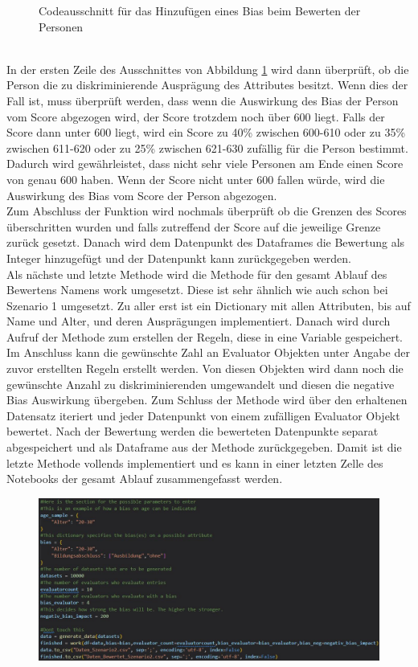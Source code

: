 \begin{onehalfspace}
\begin{figure}[h]
    \caption{Codeausschnitt für das Hinzufügen eines Bias beim Bewerten der Personen}
    \label{fig:Sz2Rate2}
\end{figure}\\
In der ersten Zeile des Ausschnittes von Abbildung \ref{fig:Sz2Rate2} wird dann überprüft, ob die Person die zu diskriminierende Ausprägung des Attributes besitzt. Wenn dies der Fall ist, muss überprüft werden, dass wenn die Auswirkung des Bias der Person vom Score abgezogen wird, der Score trotzdem noch über 600 liegt. Falls der Score dann unter 600 liegt, wird ein Score zu 40\% zwischen 600-610 oder zu 35\% zwischen 611-620 oder zu 25\% zwischen 621-630 zufällig für die Person bestimmt. Dadurch wird gewährleistet, dass nicht sehr viele Personen am Ende einen Score von genau 600 haben. Wenn der Score nicht unter 600 fallen würde, wird die Auswirkung des Bias vom Score der Person abgezogen.\\
Zum Abschluss der Funktion wird nochmals überprüft ob die Grenzen des Scores überschritten wurden und falls zutreffend der Score auf die jeweilige Grenze zurück gesetzt. Danach wird dem Datenpunkt des Dataframes die Bewertung als Integer hinzugefügt und der Datenpunkt kann zurückgegeben werden.\\
Als nächste und letzte Methode wird die Methode für den gesamt Ablauf des Bewertens Namens \glqq{}work\grqq{} umgesetzt. Diese ist sehr ähnlich wie auch schon bei Szenario 1 umgesetzt. Zu aller erst ist ein Dictionary mit allen Attributen, bis auf Name und Alter, und deren Ausprägungen implementiert. Danach wird durch Aufruf der Methode zum erstellen der Regeln, diese in eine Variable gespeichert. Im Anschluss kann die gewünschte Zahl an  \glqq{}Evaluator\grqq{} Objekten unter Angabe der zuvor erstellten Regeln erstellt werden. Von diesen Objekten wird dann noch die gewünschte Anzahl zu diskriminierenden umgewandelt und diesen die negative Bias Auswirkung übergeben. Zum Schluss der Methode wird über den erhaltenen Datensatz iteriert und jeder Datenpunkt von einem zufälligen \glqq{}Evaluator\grqq{} Objekt bewertet. Nach der Bewertung werden die bewerteten Datenpunkte separat abgespeichert und als Dataframe aus der Methode zurückgegeben. Damit ist die letzte Methode vollends implementiert und es kann in einer letzten Zelle des Notebooks der gesamt Ablauf zusammengefasst werden.
\begin{figure}[h]
    \centering
    \includegraphics[width=16cm]{Diagramme/Sz2finish.JPG}

\end{figure}
\end{onehalfspace}
